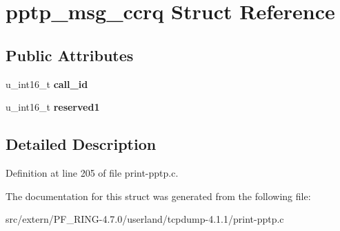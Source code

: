 \hypertarget{structpptp__msg__ccrq}{
\section{pptp\_\-msg\_\-ccrq Struct Reference}
\label{structpptp__msg__ccrq}
}
\subsection*{Public Attributes}
\begin{DoxyCompactItemize}
\item 
\hypertarget{structpptp__msg__ccrq_a8c2dd1bec3672351e76cbabe0169673b}{
u\_\-int16\_\-t {\bfseries call\_\-id}}
\label{structpptp__msg__ccrq_a8c2dd1bec3672351e76cbabe0169673b}

\item 
\hypertarget{structpptp__msg__ccrq_a6ff8f0f163c35d6dc24ddd7504ccee8f}{
u\_\-int16\_\-t {\bfseries reserved1}}
\label{structpptp__msg__ccrq_a6ff8f0f163c35d6dc24ddd7504ccee8f}

\end{DoxyCompactItemize}


\subsection{Detailed Description}


Definition at line 205 of file print-\/pptp.c.



The documentation for this struct was generated from the following file:\begin{DoxyCompactItemize}
\item 
src/extern/PF\_\-RING-\/4.7.0/userland/tcpdump-\/4.1.1/print-\/pptp.c\end{DoxyCompactItemize}

